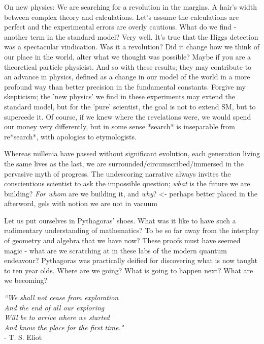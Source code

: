 			On new physics: We are searching for a revolution in the margins.
	A hair's width between complex theory and calculations.
	Let's assume the calculations are perfect and the experimental errors are overly cautious.
	What do we find - another term in the standard model? Very well.
	It's true that the Higgs detection was a spectacular vindication.
	Was it a revolution? Did it change how we think of our place in the world, alter what we thought was possible? Maybe if you are a theoretical particle physicist.
	And so with these results; they may contribute to an advance in physics, defined as a change in our model of the world in a more profound way than better precision in the fundamental constants.
	Forgive my skepticism; the 'new physics' we find in these experiments may extend the standard model, but for the 'pure' scientist, the goal is not to extend SM, but to supercede it.
	Of course, if we knew where the revelations were, we would spend our money very differently, but in some sense *search* is inseparable from re*search*, with apologies to etymologists.


Whereas millenia have passed without significant evolution, each generation living the same lives as the last, we are surrounded/circumscribed/immersed in the pervasive myth of progress.
	The undescoring narrative always invites the conscientious scientist to ask the impossible question; \emph{what} is the future we are building? \emph{For whom} are we building it, and \emph{why}? <- perhaps better placed in the afterword, gels with notion we are not in vacuum
	

Let us put ourselves in Pythagoras' shoes. What was it like to have such a rudimentary understanding of mathematics? To be so far away from the interplay of geometry and algebra that we have now? These proofs must have seemed magic - what are we scratching at in these labs of the modern quantum endeavour? Pythagoras was practically deified for discovering what is now taught to ten year olds. Where are we going? What is going to happen next? What are we becoming?




\vfill
\begin{flushright}
\emph{``We shall not cease from exploration\\
And the end of all our exploring \\
Will be to arrive where we started \\
And know the place for the first time."\\} 
- T. S.	Eliot
\end{flushright}
\vfill

